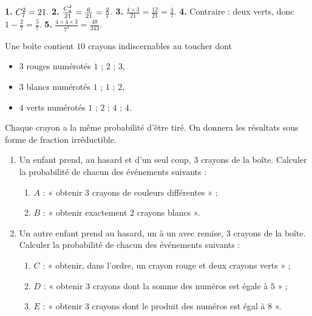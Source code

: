 \begin{corrige}[je me teste]
\textbf{1.} $\combi{2}{7} = 21$.
\textbf{2.} $\frac{\combi{2}{4}}{21} = \frac{6}{21} = \frac27$.
\textbf{3.} $\frac{4\times3}{21} = \frac{12}{21} = \frac47$.
\textbf{4.} Contraire : deux verts, donc $1-\frac27 = \frac57$.
\textbf{5.} $\frac{4\times4\times3}{7^{3}} = \frac{48}{343}$.
\end{corrige}

\begin{commeaubac}
Une boîte contient $10$ crayons indiscernables au toucher dont
\begin{itemize}[leftmargin=1.6em, itemsep=0.1em]
  \item $3$ rouges numérotés $1$ ; $2$ ; $3$,
  \item $3$ blancs numérotés $1$ ; $1$ ; $2$,
  \item $4$ verts numérotés $1$ ; $2$ ; $4$ ; $4$.
\end{itemize}
Chaque crayon a la même probabilité d'être tiré. On donnera les résultats
sous forme de fraction irréductible.

\begin{enumerate}[label=\textbf{\arabic*.}, leftmargin=*, itemsep=0.25em]
  \item Un enfant prend, au hasard et d'un seul coup, $3$ crayons de la
        boîte. Calculer la probabilité de chacun des événements suivants :
    \begin{enumerate}[label=\textbf{\alph*)}, leftmargin=1.4em, itemsep=0.12em]
      \item $A$ : « obtenir $3$ crayons de couleurs différentes » ;
            \bareme{1 pt}
      \item $B$ : « obtenir exactement $2$ crayons blancs ». \bareme{1 pt}
    \end{enumerate}
  \item Un autre enfant prend au hasard, un à un avec remise, $3$ crayons de
        la boîte. Calculer la probabilité de chacun des événements
        suivants :
    \begin{enumerate}[label=\textbf{\alph*)}, leftmargin=1.4em, itemsep=0.12em]
      \item $C$ : « obtenir, dans l'ordre, un crayon rouge et deux crayons
            verts » ; \bareme{1 pt}
      \item $D$ : « obtenir $3$ crayons dont la somme des numéros est égale
            à $5$ » ; \bareme{1 pt}
      \item $E$ : « obtenir $3$ crayons dont le produit des numéros est égal
            à $8$ ». \bareme{1 pt}
    \end{enumerate}
\end{enumerate}
\end{commeaubac}

